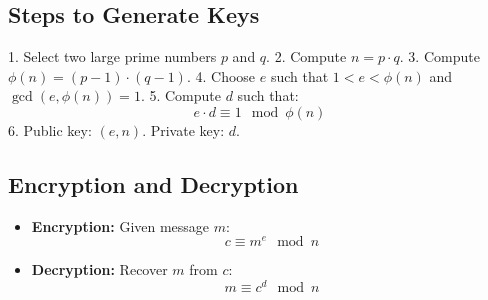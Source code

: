 \documentclass[12pt]{article}
\begin{document}
\subsection*{Steps to Generate Keys}
1. Select two large prime numbers \( p \) and \( q \).
2. Compute \( n = p \cdot q \).
3. Compute \( \phi(n) = (p-1) \cdot (q-1) \).
4. Choose \( e \) such that \( 1 < e < \phi(n) \) and \( \gcd(e, \phi(n)) = 1 \).
5. Compute \( d \) such that:
\[
e \cdot d \equiv 1 \mod \phi(n)
\]
6. Public key: \( (e, n) \). Private key: \( d \).

\subsection*{Encryption and Decryption}
\begin{itemize}
    \item \textbf{Encryption:} Given message \( m \):
    \[
    c \equiv m^e \mod n
    \]
    \item \textbf{Decryption:} Recover \( m \) from \( c \):
    \[
    m \equiv c^d \mod n
    \]
\end{itemize}
\end{document}
